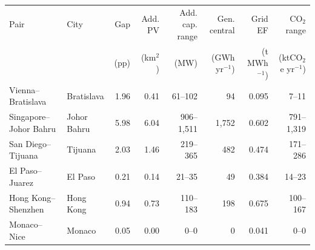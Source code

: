 \begin{tabular}{@{}llrrrrrr@{}}
\toprule
Pair & City & Gap & Add. PV & Add. cap. range & Gen. central & Grid EF & CO$_2$ range \\
 & & (pp) & (km$^2$) & (MW) & (GWh yr$^{-1}$) & (t MWh$^{-1}$) & (ktCO$_2$e yr$^{-1}$) \\
\midrule
Vienna--Bratislava & Bratislava & 1.96 & 0.41 & 61--102 & 94 & 0.095 & 7--11 \\
Singapore--Johor Bahru & Johor Bahru & 5.98 & 6.04 & 906--1,511 & 1,752 & 0.602 & 791--1,319 \\
San Diego--Tijuana & Tijuana & 2.03 & 1.46 & 219--365 & 482 & 0.474 & 171--286 \\
El Paso--Juarez & El Paso & 0.21 & 0.14 & 21--35 & 49 & 0.384 & 14--23 \\
Hong Kong--Shenzhen & Hong Kong & 0.94 & 0.73 & 110--183 & 198 & 0.675 & 100--167 \\
Monaco--Nice & Monaco & 0.05 & 0.00 & 0--0 & 0 & 0.041 & 0--0 \\
\bottomrule
\end{tabular}
